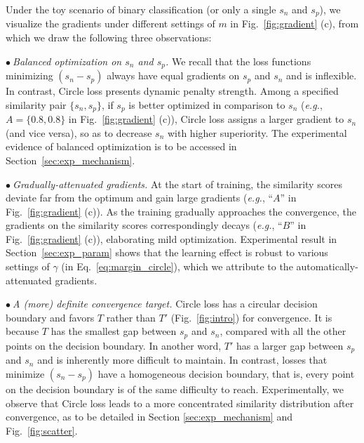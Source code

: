 \documentclass[10pt,twocolumn,letterpaper]{article}
\begin{document}
Under the toy scenario of binary classification (or only a single $s_n$ and $s_p$), we visualize the gradients under different settings of $m$ in Fig.~\ref{fig:gradient} (c), from which we draw the following three observations:

$\bullet~$\emph{Balanced optimization on $s_n$ and $s_p$.} We recall that the loss functions minimizing $(s_n-s_p)$ always have equal gradients on $s_p$ and $s_n$ and is inflexible. In contrast, Circle loss presents dynamic penalty strength. Among a specified similarity pair $\{s_n, s_p\}$, if $s_p$ is better optimized in comparison to $s_n$ (\emph{e.g.}, $A=\{0.8,0.8\}$ in Fig.~\ref{fig:gradient} (c)), Circle loss assigns a larger gradient to $s_n$ (and vice versa), so as to decrease $s_n$ with higher superiority. The experimental evidence of balanced optimization is to be accessed in Section~\ref{sec:exp_mechanism}.

$\bullet~$\emph{Gradually-attenuated gradients.} At the start of training, the similarity scores deviate far from the optimum and gain large gradients (\emph{e.g.}, ``$A$'' in Fig.~\ref{fig:gradient} (c)). As the training gradually approaches the convergence, the gradients on the similarity scores correspondingly decays (\emph{e.g.}, ``$B$'' in Fig.~\ref{fig:gradient} (c)), elaborating mild optimization. Experimental result in Section~\ref{sec:exp_param} shows that the learning effect is robust to various settings of $\gamma$ (in Eq.~\ref{eq:margin_circle}), which we attribute to the automatically-attenuated gradients. 

$\bullet~$\emph{A (more) definite convergence target.}
Circle loss has a circular decision boundary and favors $T$ rather than $T'$ (Fig.~\ref{fig:intro}) for convergence. It is because $T$ has the smallest gap between $s_p$ and $s_n$, compared with all the other points on the decision boundary. In another word, $T'$ has a larger gap between $s_p$ and $s_n$ and is inherently more difficult to maintain. In contrast, losses that minimize $(s_n - s_p)$ have a homogeneous decision boundary, that is, every point on the decision boundary is of the same difficulty to reach. 
Experimentally, we observe that Circle loss leads to a more concentrated similarity distribution after convergence, as to be detailed in Section \ref{sec:exp_mechanism} and Fig.~\ref{fig:scatter}.


\end{document}
